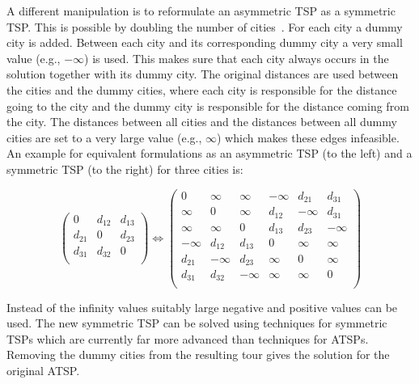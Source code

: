 \documentclass[10pt,a4paper,fleqn]{article}
\begin{document}
A different manipulation is to reformulate an asymmetric TSP as a symmetric TSP.
This is possible by doubling the number of cities~\citep{Jonker1983}. For each
city a dummy city is added. Between each city and its corresponding dummy city
a very small value (e.g., $-\infty$) is used.  This makes sure that each
city always occurs in the solution together with its dummy city. The original
distances are used between the cities and the dummy cities, where each city is
responsible for the distance going to the city and the dummy city is
responsible for the distance coming from the city. The distances between all
cities and the distances between all dummy cities are set to a very large
value (e.g., $\infty$) which makes these edges infeasible. An example for
equivalent formulations as an asymmetric TSP (to the left) and
a symmetric TSP (to the right) for
three cities is:

\begin{equation*}
\begin{pmatrix}
    0       &d_{12}    &d_{13}    \\
    d_{21} &0          &d_{23}    \\
    d_{31} &d_{32}    &0          \\
\end{pmatrix}
\Longleftrightarrow
\begin{pmatrix}
  0         &\infty     &\infty     & -\infty       &d_{21}    &d_{31}    \\
  \infty    &0          &\infty     & d_{12} &-\infty          &d_{31}    \\
  \infty    &\infty     &0          & d_{13} &d_{23}    &-\infty          \\
  -\infty         &d_{12}    &d_{13}    & 0       &\infty    &\infty      \\
  d_{21}   &-\infty          &d_{23}    & \infty &0         &\infty       \\  
  d_{31}   &d_{32}    &-\infty          & \infty &\infty   &0             \\
\end{pmatrix}
\end{equation*}

Instead of the infinity values suitably large negative and positive values can
be used.  The new symmetric TSP can be solved using techniques for symmetric
TSPs which are currently far more advanced than techniques for ATSPs.
Removing the dummy cities from the resulting tour gives the  solution for the
original ATSP.
\end{document}
